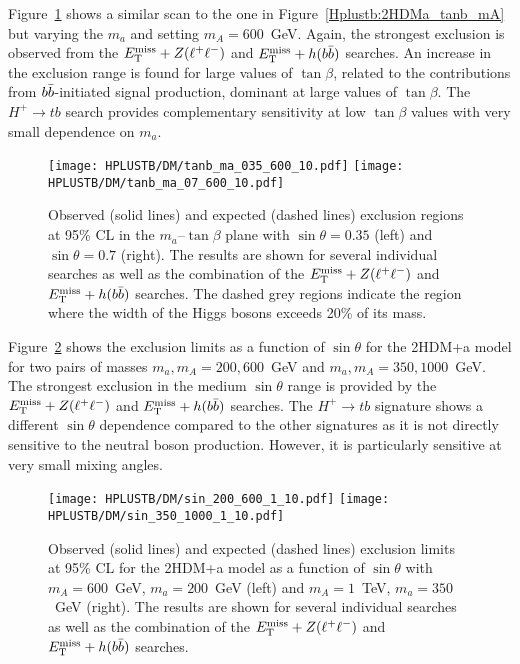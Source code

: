 Figure~\ref{Hplustb:2HDMa_tanb_ma} shows a similar scan to the one in Figure~\ref{Hplustb:2HDMa_tanb_mA} but varying the $m_a$ and setting $m_A=600$~GeV. Again, the strongest exclusion is observed from the $E_{\text{T}}^{\text{miss}}+ Z(\ell^+\ell^-)$ and $E_{\text{T}}^{\text{miss}}+ h(b\bar{b})$ searches. An increase in the exclusion range is found for large values of $\tan\beta$, related to the contributions from $b\bar{b}$-initiated signal production, dominant at large values of $\tan\beta$. The $H^+\to tb$ search provides complementary sensitivity at low $\tan\beta$ values with very small dependence on $m_a$.\\

\begin{figure}[htb]
    \RawFloats
    \centering
    \texttt{[image: HPLUSTB/DM/tanb\_ma\_035\_600\_10.pdf]}
    \texttt{[image: HPLUSTB/DM/tanb\_ma\_07\_600\_10.pdf]}
    \caption{Observed (solid lines) and expected (dashed lines) exclusion regions at 95\% CL in the $m_a$--$\tan\beta$ plane with $\sin\theta=0.35$ (left) and $\sin\theta=0.7$ (right). The results are shown for several individual searches as well as the combination of the $E_{\text{T}}^{\text{miss}}+Z(\ell^+\ell^-)$ and $E_{\text{T}}^{\text{miss}}+h(b\bar{b})$ searches. The dashed grey regions indicate the region where the width of the Higgs bosons exceeds 20\% of its mass.}
    \label{Hplustb:2HDMa_tanb_ma}
\end{figure}

Figure~\ref{Hplustb:2HDMa_sintheta} shows the exclusion limits as a function of $\sin\theta$ for the 2HDM+a model for two pairs of masses $m_a,m_A = 200, 600$~GeV and $m_a,m_A=350,1000$~GeV. The strongest exclusion in the medium $\sin\theta$ range is provided by the $E_{\text{T}}^{\text{miss}}+ Z(\ell^+\ell^-)$ and $E_{\text{T}}^{\text{miss}}+ h(b\bar{b})$ searches. The $H^+\to tb$ signature shows a different $\sin\theta$ dependence compared to the other signatures as it is not directly sensitive to the neutral boson production. However, it is particularly sensitive at very small mixing angles.\\

\begin{figure}[htb]
    \RawFloats
    \centering
    \texttt{[image: HPLUSTB/DM/sin\_200\_600\_1\_10.pdf]}
    \texttt{[image: HPLUSTB/DM/sin\_350\_1000\_1\_10.pdf]}
    \caption{Observed (solid lines) and expected (dashed lines) exclusion limits at 95\% CL for the 2HDM+a model as a function of $\sin\theta$ with $m_A = 600$~GeV, $m_a = 200$~GeV (left) and $m_A = 1$~TeV, $m_a = 350$~GeV (right). The results are shown for several individual searches as well as the combination of the $E_{\text{T}}^{\text{miss}}+Z(\ell^+\ell^-)$ and $E_{\text{T}}^{\text{miss}}+h(b\bar{b})$ searches.}
    \label{Hplustb:2HDMa_sintheta}
\end{figure}

